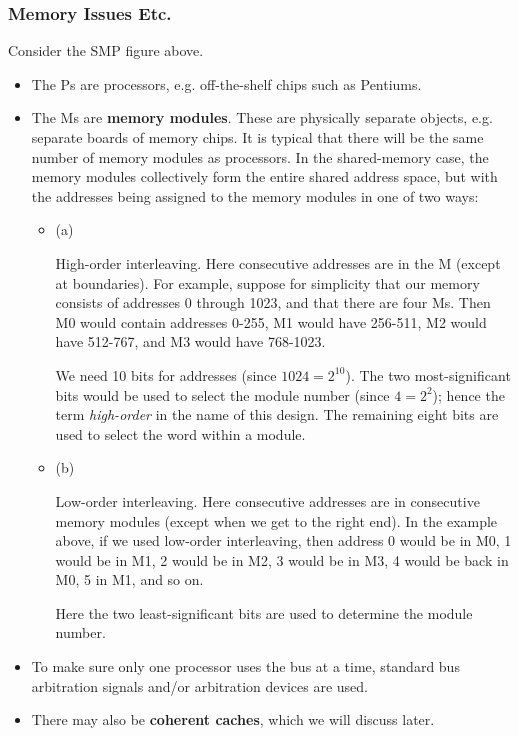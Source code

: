 \subsubsection{Memory Issues Etc.}

Consider the SMP figure above.

\begin{itemize}

\item The Ps are processors, e.g. off-the-shelf chips such as Pentiums.

\item The Ms are \textbf{memory modules}. These are physically separate
objects, e.g. separate boards of memory chips.  It is typical that there
will be the same number of memory modules as processors.  In the
shared-memory case, the memory modules collectively form the entire
shared address space, but with the addresses being assigned to the
memory modules in one of two ways:

\begin{itemize}

\item (a)

High-order interleaving. Here consecutive addresses are in the
 M (except at boundaries). For example, suppose for
simplicity that our memory consists of addresses 0 through 1023, and
that there are four Ms.  Then M0 would contain addresses 0-255, M1 would
have 256-511, M2 would have 512-767, and M3 would have
768-1023.

We need 10 bits for addresses (since $1024 = 2^{10}$).  The two
most-significant bits would be used to select the module number (since
$4 = 2^2$); hence the term {\it high-order} in the name of this design.
The remaining eight bits are used to select the word within a module.

\item (b)

Low-order interleaving. Here consecutive addresses are in consecutive
memory modules (except when we get to the right end). In the example
above, if we used low-order interleaving, then address 0 would be in M0,
1 would be in M1, 2 would be in M2, 3 would be in M3, 4 would be back in
M0, 5 in M1, and so on.

Here the two least-significant bits are used to determine the module
number.

\end{itemize}

\item To make sure only one processor uses the bus at a time, standard bus
arbitration signals and/or arbitration devices are used.

\item There may also be \textbf{coherent caches}, which we will discuss later.

\end{itemize}

